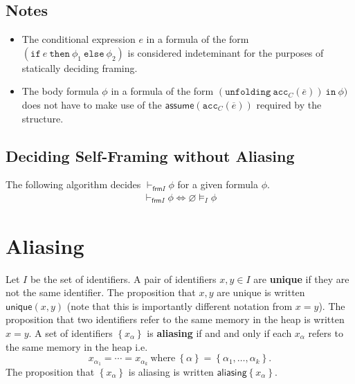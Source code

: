 \documentclass{article}
\newcommand{\tsf}{\textsf}
\newcommand{\tbf}{\textbf}
\newcommand{\ttt}{\texttt}
\newcommand{\assume}{\tsf{assume}}
\newcommand{\frames}{\vDash_I}
\newcommand{\selfframes}{\vdash_{\tsf{frm}I}}
\newcommand{\set}[1]{\left\{ #1 \right\}}
\renewcommand{\vec}{\overline}
\renewcommand{\empty}{\varnothing}
\newcommand{\cif}{\ttt{if}}
\newcommand{\cthen}{\ttt{then}}
\newcommand{\celse}{\ttt{else}}
\newcommand{\cacc}{\ttt{acc}}
\newcommand{\cunfolding}{\ttt{unfolding}}
\newcommand{\cin}{\ttt{in}}
\newcommand{\aliasing}{\tsf{aliasing}}
\newcommand{\unique}{\tsf{unique}}
\begin{document}
\subsection{Notes}

\begin{itemize}
\item The conditional expression $e$ in a formula of the form $(\cif \ e \ \cthen \ \phi_1 \ \celse \ \phi_2)$ is considered indeteminant for the purposes of statically deciding framing.

\item The body formula $\phi$ in a formula of the form $(\cunfolding \ \cacc_C(\vec{e})) \ \cin \ \phi)$ does not have to make use of the $\assume(\cacc_C(\vec{e}))$ required by the structure.
\end{itemize}

\subsection{Deciding Self-Framing without Aliasing}

\noindent
The following algorithm decides $\selfframes \phi$ for a given formula $\phi$.
\begin{align*}
\selfframes \phi \iff \empty \frames \phi
\end{align*}

\newpage
\section{Aliasing}

Let $I$ be the set of identifiers.
A pair of identifiers $x,y \in I$ are \tbf{unique} if they are not the same identifier.
The proposition that $x,y$ are unique is written $\unique(x,y)$ (note that this is importantly different notation from $x=y$).
The proposition that two identifiers refer to the same memory in the heap is written $x = y$.
A set of identifiers $\set{ x_\alpha }$ is \tbf{aliasing} if and and only if each $x_\alpha$ refers to the same memory in the heap i.e.
$$
x_{\alpha_1} = \cdots = x_{\alpha_k} \ \text{where} \ \set{\alpha} = \set{\alpha_1, \dots, \alpha_k}.
$$
The proposition that $\set{ x_\alpha }$ is aliasing is written $\aliasing \set{ x_\alpha }$.
\end{document}
